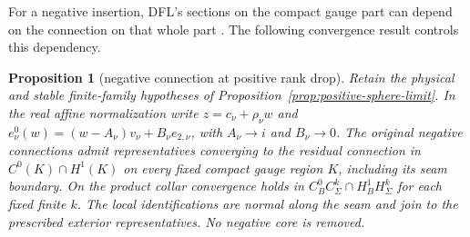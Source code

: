 \documentclass[11pt]{amsart}
\newtheorem{proposition}[theorem]{Proposition}
\theoremstyle{definition}
\theoremstyle{remark}
\theoremstyle{plain}
\begin{document}
For a negative insertion, DFL's sections on the compact gauge
part can depend on the connection on that whole part
\cite[Section~7.2, condition~(iii)]{DaeFukLip21a}.
The following convergence result controls this dependency.

\begin{proposition}[negative connection at positive rank drop]
\label{prop:positive-negative-collapse}
Retain the physical and stable finite-family hypotheses of
Proposition~\ref{prop:positive-sphere-limit}.
In the real affine normalization write
$z=c_\nu+\rho_\nu w$ and
$e_\nu^0(w)=(w-A_\nu)v_\nu+B_\nu e_{2,\nu}$, with
$A_\nu\to i$ and $B_\nu\to0$.
The original negative connections admit representatives converging
to the residual connection in $C^0(K)\cap H^1(K)$ on every
fixed compact gauge region $K$, including its seam boundary.
On the product collar convergence holds in
$C_B^0C_\Sigma^k\cap H_B^1H_\Sigma^k$ for each fixed finite $k$.
The local identifications are normal along the seam and join
to the prescribed exterior representatives. No negative core
is removed.
\end{proposition}
\end{document}
